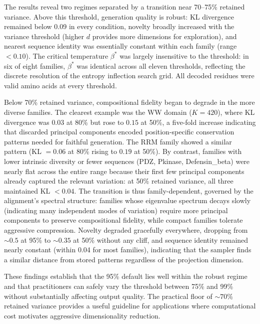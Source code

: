 The results reveal two regimes separated by a transition near 70--75\% retained variance. Above this threshold, generation quality is robust: KL divergence remained below 0.09 in every condition, novelty broadly increased with the variance threshold (higher $d$ provides more dimensions for exploration), and nearest sequence identity was essentially constant within each family (range $<0.10$). The critical temperature $\beta^*$ was largely insensitive to the threshold: in six of eight families, $\beta^*$ was identical across all eleven thresholds, reflecting the discrete resolution of the entropy inflection search grid. All decoded residues were valid amino acids at every threshold.

Below 70\% retained variance, compositional fidelity began to degrade in the more diverse families. The clearest example was the WW domain ($K{=}420$), where KL divergence was $0.03$ at 80\% but rose to $0.15$ at 50\%, a five-fold increase indicating that discarded principal components encoded position-specific conservation patterns needed for faithful generation. The RRM family showed a similar pattern (KL $= 0.06$ at 80\% rising to $0.19$ at 50\%). By contrast, families with lower intrinsic diversity or fewer sequences (PDZ, Pkinase, Defensin\_beta) were nearly flat across the entire range because their first few principal components already captured the relevant variation: at 50\% retained variance, all three maintained KL $< 0.04$. The transition is thus family-dependent, governed by the alignment's spectral structure: families whose eigenvalue spectrum decays slowly (indicating many independent modes of variation) require more principal components to preserve compositional fidelity, while compact families tolerate aggressive compression. Novelty degraded gracefully everywhere, dropping from ${\sim}0.5$ at 95\% to ${\sim}0.35$ at 50\% without any cliff, and sequence identity remained nearly constant (within 0.04 for most families), indicating that the sampler finds a similar distance from stored patterns regardless of the projection dimension.

These findings establish that the 95\% default lies well within the robust regime and that practitioners can safely vary the threshold between 75\% and 99\% without substantially affecting output quality. The practical floor of ${\sim}70$\% retained variance provides a useful guideline for applications where computational cost motivates aggressive dimensionality reduction.

